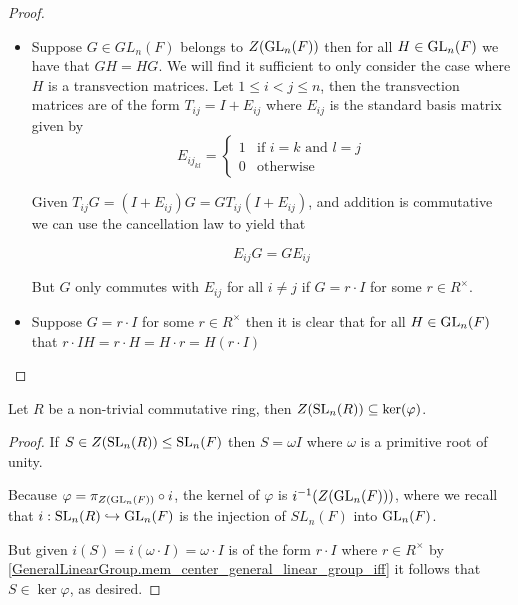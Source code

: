     \begin{proof}
        \leanok
        \begin{itemize}
        \item Suppose $G \in GL_n(F)$ belongs to $Z(\operatorname{GL}_n(F))$ then for all $H \in \operatorname{GL}_n(F)$ we have that $G H = H G$. We will find it sufficient to only consider the case where $H$ is a transvection matrices.
        Let $1 \leq i < j \leq n$, then the transvection matrices are of the form $T_{ij} = I + E_{ij}$ where $E_{ij}$ is the standard basis matrix given by
        \[
        E_{{ij}_{kl}} = \begin{cases}
        1 & \text{if $i = k$ and $l = j$}\\
        0 & \text{otherwise}
        \end{cases}
        \] 
    
        Given $T_{ij} G = (I + E_{ij}) G = G T_{ij} (I + E_{ij})$, and addition is commutative we can use the cancellation law to yield that
        
        \[
        E_{ij} G = G E_{ij}
        \]
    
        But $G$ only commutes with $E_{ij}$ for all $i \neq j$ if $G = r \cdot I$ for some $r \in R^\times$.
        
        \item Suppose $G = r \cdot I$ for some $r \in R^\times$ then it is clear that for all $H \in \operatorname{GL}_n(F)$ that $r \cdot I  H = r \cdot H = H \cdot r = H (r \cdot I)$
        \end{itemize}
    \end{proof}

\begin{lemma}
\label{center_SL_le_ker}
\leanok
Let $R$ be a non-trivial commutative ring, then $Z(\operatorname{SL}_n(R)) \subseteq \ker (\varphi)$.
\end{lemma}

\begin{proof}
\leanok
If $S \in Z(\operatorname{SL}_n(R)) \leq \operatorname{SL}_n(F)$ then $S = \omega I$ where $\omega$ is a primitive root of unity.

Because $\varphi = \pi_{Z(\operatorname{GL}_n(F))} \circ i$, the kernel of $\varphi$ is $i^{-1}(Z(\operatorname{GL}_n(F)))$, where we recall that $i : \operatorname{SL}_n(R) \hookrightarrow \operatorname{GL}_n(F)$ is the injection of $SL_n(F)$ into $\operatorname{GL}_n(F)$.

But given $i(S) = i(\omega \cdot I) = \omega \cdot I$ is of the form $r \cdot I$ where $r \in R^\times$ by \ref{GeneralLinearGroup.mem_center_general_linear_group_iff} it follows that $S \in \ker \varphi$, as desired.
\end{proof}



